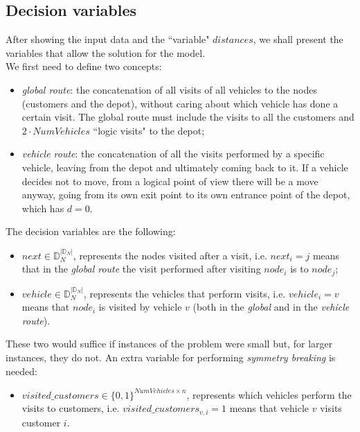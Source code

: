 \documentclass[../main.tex]{subfiles}
\begin{document}
\subsection{Decision variables}
After showing the input data and the ``variable" $distances$, we shall present the variables that allow the solution for the model.\\
We first need to define two concepts:
\begin{itemize}
    \item \textit{global route}: the concatenation of all visits of all vehicles to the nodes (customers and the depot), without caring about which vehicle has done a certain visit. The global route must include the visits to all the customers and $2 \cdot NumVehicles$ ``logic visits" to the depot;
    \item \textit{vehicle route}: the concatenation of all the visits performed by a specific vehicle, leaving from the depot and ultimately coming back to it. If a vehicle decides not to move, from a logical point of view there will be a move anyway, going from its own exit point to its own entrance point of the depot, which has $d = 0$.
\end{itemize}
The decision variables are the following:
\begin{itemize}
    \item $next \in \mathbb{D}_N^{|\mathbb{D}_N|}$, represents the nodes visited after a visit, i.e. $next_i = j$ means that in the \textit{global route} the visit performed after visiting $node_i$ is to $node_j$;
    \item $vehicle \in \mathbb{D}_N^{|\mathbb{D}_N|}$, represents the vehicles that perform visits, i.e. $vehicle_i = v$ means that $node_i$ is visited by vehicle $v$ (both in the \textit{global} and in the \textit{vehicle route}).
\end{itemize}
These two would suffice if instances of the problem were small but, for larger instances, they do not. An extra variable for performing \textit{symmetry breaking} is needed:
\begin{itemize}
    \item $visited\_customers \in \{0,1\}^{NumVehicles\times{}n}$, represents which vehicles perform the visits to customers, i.e. $visited\_customers_{v,i} = 1$ means that vehicle $v$ visits customer $i$.
\end{itemize}
\end{document}
